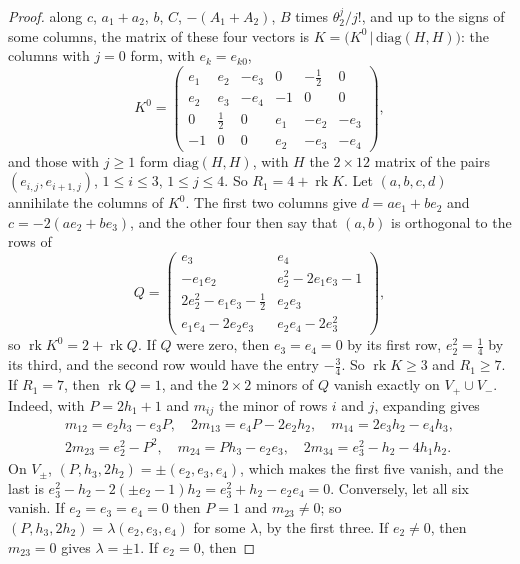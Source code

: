 \begin{proof}
along $c$, $a_{1}+a_{2}$, $b$, $C$, $-(A_{1}+A_{2})$, $B$ times
$\theta_{2}^{j}/j!$, and up to the signs of some columns, the matrix of these
four vectors is $K=\bigl(K^{0}\,\big|\,\mathrm{diag}(H,H)\bigr)$: the columns
with $j=0$ form, with $e_{k}=e_{k0}$,
\[
  K^{0}=\begin{pmatrix}
  e_{1}&e_{2}&-e_{3}&0&-\frac12&0\\
  e_{2}&e_{3}&-e_{4}&-1&0&0\\
  0&\frac12&0&e_{1}&-e_{2}&-e_{3}\\
  -1&0&0&e_{2}&-e_{3}&-e_{4}
  \end{pmatrix},
\]
and those with $j\ge1$ form $\mathrm{diag}(H,H)$, with $H$ the $2\times12$
matrix of the pairs $(e_{i,j},e_{i+1,j})$, $1\le i\le3$, $1\le j\le4$. So
$R_{1}=4+\operatorname{rk}K$. Let
$(a,b,c,d)$ annihilate the columns of $K^{0}$. The first two columns give
$d=ae_{1}+be_{2}$ and $c=-2(ae_{2}+be_{3})$, and the other four then say that
$(a,b)$ is orthogonal to the rows of
\[
  Q=\begin{pmatrix}
  e_{3}&e_{4}\\
  -e_{1}e_{2}&e_{2}^{2}-2e_{1}e_{3}-1\\
  2e_{2}^{2}-e_{1}e_{3}-\frac12&e_{2}e_{3}\\
  e_{1}e_{4}-2e_{2}e_{3}&e_{2}e_{4}-2e_{3}^{2}
  \end{pmatrix},
\]
so $\operatorname{rk}K^{0}=2+\operatorname{rk}Q$. If $Q$ were zero, then
$e_{3}=e_{4}=0$ by its first row, $e_{2}^{2}=\frac14$ by its third, and the
second row would have the entry $-\frac34$. So $\operatorname{rk}K\ge3$ and
$R_{1}\ge7$. If $R_{1}=7$, then $\operatorname{rk}Q=1$, and the $2\times2$
minors of $Q$ vanish exactly on $V_{+}\cup V_{-}$. Indeed, with
$P=2h_{1}+1$ and $m_{ij}$ the minor of rows $i$ and $j$, expanding gives
\begin{gather*}
  m_{12}=e_{2}h_{3}-e_{3}P,\quad 2m_{13}=e_{4}P-2e_{2}h_{2},\quad
  m_{14}=2e_{3}h_{2}-e_{4}h_{3},\\
  2m_{23}=e_{2}^{2}-P^{2},\quad m_{24}=Ph_{3}-e_{2}e_{3},\quad
  2m_{34}=e_{3}^{2}-h_{2}-4h_{1}h_{2}.
\end{gather*}
On $V_{\pm}$, $(P,h_{3},2h_{2})=\pm(e_{2},e_{3},e_{4})$, which makes the first
five vanish, and the last is $e_{3}^{2}-h_{2}-2(\pm e_{2}-1)h_{2}=
e_{3}^{2}+h_{2}-e_{2}e_{4}=0$. Conversely, let all six vanish. If
$e_{2}=e_{3}=e_{4}=0$ then $P=1$ and $m_{23}\ne0$; so
$(P,h_{3},2h_{2})=\lambda(e_{2},e_{3},e_{4})$ for some $\lambda$, by the first
three. If $e_{2}\ne0$, then $m_{23}=0$ gives $\lambda=\pm1$. If $e_{2}=0$, then

\end{proof}
